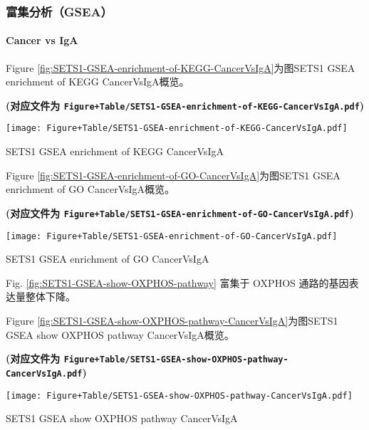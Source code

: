 \documentclass[
]{article}
\begin{document}
\hypertarget{ux5bccux96c6ux5206ux6790gsea}{%
\subsubsection{富集分析（GSEA）}\label{ux5bccux96c6ux5206ux6790gsea}}

\hypertarget{cancer-vs-iga}{%
\paragraph{Cancer vs IgA}\label{cancer-vs-iga}}

Figure \ref{fig:SETS1-GSEA-enrichment-of-KEGG-CancerVsIgA}为图SETS1 GSEA enrichment of KEGG CancerVsIgA概览。

\textbf{(对应文件为 \texttt{Figure+Table/SETS1-GSEA-enrichment-of-KEGG-CancerVsIgA.pdf})}

\def\@captype{figure}
\begin{center}
\texttt{[image: Figure+Table/SETS1-GSEA-enrichment-of-KEGG-CancerVsIgA.pdf]}
\caption{SETS1 GSEA enrichment of KEGG CancerVsIgA}\label{fig:SETS1-GSEA-enrichment-of-KEGG-CancerVsIgA}
\end{center}

Figure \ref{fig:SETS1-GSEA-enrichment-of-GO-CancerVsIgA}为图SETS1 GSEA enrichment of GO CancerVsIgA概览。

\textbf{(对应文件为 \texttt{Figure+Table/SETS1-GSEA-enrichment-of-GO-CancerVsIgA.pdf})}

\def\@captype{figure}
\begin{center}
\texttt{[image: Figure+Table/SETS1-GSEA-enrichment-of-GO-CancerVsIgA.pdf]}
\caption{SETS1 GSEA enrichment of GO CancerVsIgA}\label{fig:SETS1-GSEA-enrichment-of-GO-CancerVsIgA}
\end{center}

Fig. \ref{fig:SETS1-GSEA-show-OXPHOS-pathway} 富集于 OXPHOS 通路的基因表达量整体下降。

Figure \ref{fig:SETS1-GSEA-show-OXPHOS-pathway-CancerVsIgA}为图SETS1 GSEA show OXPHOS pathway CancerVsIgA概览。

\textbf{(对应文件为 \texttt{Figure+Table/SETS1-GSEA-show-OXPHOS-pathway-CancerVsIgA.pdf})}

\def\@captype{figure}
\begin{center}
\texttt{[image: Figure+Table/SETS1-GSEA-show-OXPHOS-pathway-CancerVsIgA.pdf]}
\caption{SETS1 GSEA show OXPHOS pathway CancerVsIgA}\label{fig:SETS1-GSEA-show-OXPHOS-pathway-CancerVsIgA}
\end{center}
\end{document}
